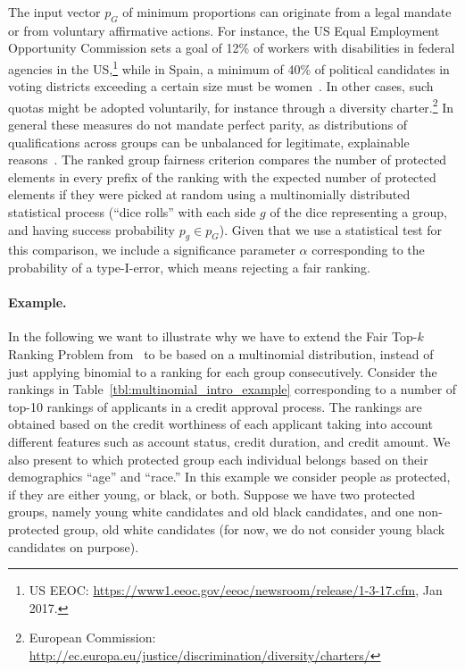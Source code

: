 The input vector $p_G$ of minimum proportions can originate from a legal mandate or from voluntary affirmative actions.
%
For instance, the US Equal Employment Opportunity Commission sets a goal of 12\% of workers with disabilities in federal agencies in the US,\footnote{US EEOC: \url{https://www1.eeoc.gov/eeoc/newsroom/release/1-3-17.cfm}, Jan 2017.}
%
while in Spain, a minimum of 40\% of political candidates in voting districts exceeding a certain size must be women~\cite{verge2010gendering}.
%
In other cases, such quotas might be adopted voluntarily, for instance through a diversity charter.\footnote{European Commission: \url{http://ec.europa.eu/justice/discrimination/diversity/charters/}}
%
In general these measures do not mandate perfect parity, as distributions of qualifications across groups can be unbalanced for legitimate, explainable reasons~\cite{zliobaite2011handling,pedreschi2009integrating}. %
%
The ranked group fairness criterion compares the number of protected elements in every prefix of the ranking with the expected number of protected elements if they were picked at random using a multinomially distributed statistical process (``dice rolls'' with each side $g$ of the dice representing a group, and having success probability $p_g \in p_G$).
%
Given that we use a statistical test for this comparison, we include a significance parameter $\alpha$ corresponding to the probability of a type-I-error, which means rejecting a fair ranking.
%

\paragraph{Example.} In the following we want to illustrate why we have to extend the Fair Top-$k$ Ranking Problem from~\citet{zehlike2017fair} to be based on a multinomial distribution, instead of just applying binomial \algoFAIR to a ranking for each group consecutively.
%
Consider the rankings in Table~\ref{tbl:multinomial_intro_example} corresponding to a number of top-10 rankings of applicants in a credit approval process.
%
The rankings are obtained based on the credit worthiness of each applicant taking into account different features such as account status, credit duration, and credit amount.
%
We also present to which protected group each individual belongs based on their demographics ``age'' and ``race.''
%
In this example we consider people as protected, if they are either young, or black, or both.
%
Suppose we have two protected groups, namely young white candidates and old black candidates, and one non-protected group, old white candidates (for now, we do not consider young black candidates on purpose).

